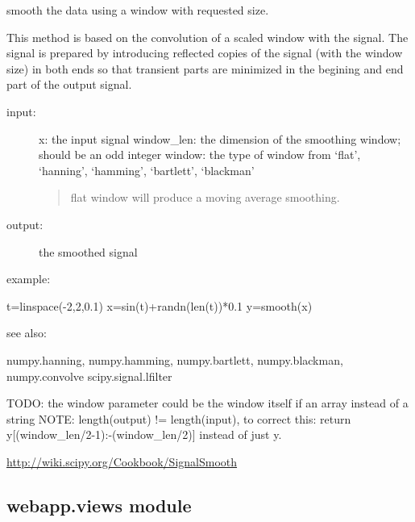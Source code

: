 \documentclass[letterpaper,10pt,english]{sphinxmanual}
\begin{document}
\begin{fulllineitems}
\label{modules/webapp:webapp.timeseries.smooth}
smooth the data using a window with requested size.

This method is based on the convolution of a scaled window with the signal.
The signal is prepared by introducing reflected copies of the signal 
(with the window size) in both ends so that transient parts are minimized
in the begining and end part of the output signal.
\begin{description}
\item[{input:}] \leavevmode
x: the input signal 
window\_len: the dimension of the smoothing window; should be an odd integer
window: the type of window from `flat', `hanning', `hamming', `bartlett', `blackman'
\begin{quote}

flat window will produce a moving average smoothing.
\end{quote}

\item[{output:}] \leavevmode
the smoothed signal

\end{description}

example:

t=linspace(-2,2,0.1)
x=sin(t)+randn(len(t))*0.1
y=smooth(x)

see also:

numpy.hanning, numpy.hamming, numpy.bartlett, numpy.blackman, numpy.convolve
scipy.signal.lfilter

TODO: the window parameter could be the window itself if an array instead of a string
NOTE: length(output) != length(input), to correct this: return y{[}(window\_len/2-1):-(window\_len/2){]} instead of just y.

\href{http://wiki.scipy.org/Cookbook/SignalSmooth}{http://wiki.scipy.org/Cookbook/SignalSmooth}

\end{fulllineitems}



\subsection{webapp.views module}
\label{modules/webapp:webapp-views-module}\label{modules/webapp:module-webapp.views}
\end{document}
